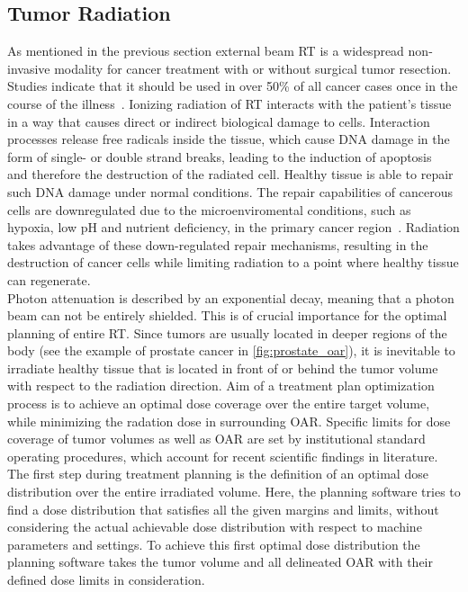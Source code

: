 \subsection{Tumor Radiation}

As mentioned in the previous section external beam \acs{RT} is a widespread non-invasive modality for cancer treatment with or without surgical tumor resection.
Studies indicate that it should be used in over 50\% of all cancer cases once in the course of the illness~\cite{delaney_role_2005}. 
Ionizing radiation of \ac{RT} interacts with the patient's tissue in a way that causes direct or indirect biological damage to cells.
Interaction processes release free radicals inside the tissue, which cause \ac{DNA} damage in the form of single- or double strand breaks, leading to the induction of apoptosis~\cite{kaina_dna_2003} and therefore the destruction of the radiated cell.
Healthy tissue is able to repair such \acs{DNA} damage under normal conditions. 
The repair capabilities of cancerous cells are downregulated due to the microenviromental conditions, such as hypoxia, low pH and nutrient deficiency, in the primary cancer region~\cite{li_dna_2021}.
Radiation takes advantage of these down-regulated repair mechanisms, resulting in the destruction of cancer cells while limiting radiation to a point where healthy tissue can regenerate.\\
Photon attenuation is described by an exponential decay, meaning that a photon beam can not be entirely shielded.
This is of crucial importance for the optimal planning of entire \ac{RT}.
Since tumors are usually located in deeper regions of the body (see the example of prostate cancer in \autoref{fig:prostate_oar}), it is inevitable to irradiate healthy tissue that is located in front of or behind the tumor volume with respect to the radiation direction. 
Aim of a treatment plan optimization process is to achieve an optimal dose coverage over the entire target volume, while minimizing the radation dose in surrounding \acs{OAR}.
Specific limits for dose coverage of tumor volumes as well as \acs{OAR} are set by institutional standard operating procedures, which account for recent scientific findings in literature.
The first step during treatment planning is the definition of an optimal dose distribution over the entire irradiated volume.
Here, the planning software tries to find a dose distribution that satisfies all the given margins and limits, without considering the actual achievable dose distribution with respect to machine parameters and settings.
To achieve this first optimal dose distribution the planning software takes the tumor volume and all delineated \acs{OAR} with their defined dose limits in consideration.
